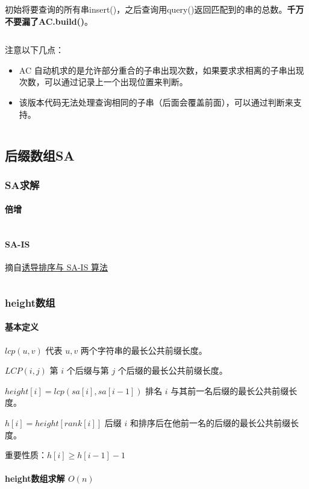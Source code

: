 \documentclass[a4paper,11pt]{article}
\begin{document}
初始将要查询的所有串insert()，之后查询用query()返回匹配到的串的总数。\textbf{千万不要漏了AC.build()}。
\inputminted[linenos]{c++}{string/ac.cpp}

注意以下几点：
\begin{itemize}
  \item AC 自动机求的是允许部分重合的子串出现次数，如果要求求相离的子串出现次数，可以通过记录上一个出现位置来判断。
  \item 该版本代码无法处理查询相同的子串（后面会覆盖前面），可以通过判断来支持。
\end{itemize}

\inputminted[linenos]{c++}{string/acplus.cpp}


\subsection{后缀数组SA}
\subsubsection{SA求解}
\paragraph{倍增}
\inputminted[linenos]{c++}{string/sabeizeng.cpp}
\paragraph{SA-IS}
摘自\href{https://riteme.site/blog/2016-6-19/sais.html}{诱导排序与 SA-IS 算法}
\inputminted[linenos,breaklines]{c++}{string/sais.cpp}

\subsubsection{height数组}
\paragraph{基本定义}

\(lcp(u,v)\) 代表 \(u,v\) 两个字符串的最长公共前缀长度。

\(LCP(i,j)\) 第 \(i\) 个后缀与第 \(j\) 个后缀的最长公共前缀长度。

\(height[i]=lcp(sa[i],sa[i-1])\) 排名 \(i\)
与其前一名后缀的最长公共前缀长度。

\(h[i]=height[rank[i]]\) 后缀 \(i\)
和排序后在他前一名的后缀的最长公共前缀长度。

重要性质：\(h[i]\ge h[i-1]-1\)

\paragraph{height数组求解 \(O(n)\)}
\inputminted[linenos,breaklines]{c++}{string/height.cpp}
\end{document}
